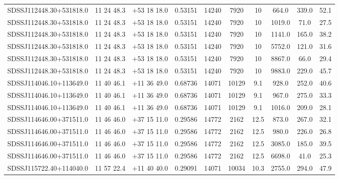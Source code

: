 \begin{landscape}
\begin{center}
\begin{longtable}{l c c c c c c c c c}
SDSSJ112448.30+531818.0  & 11 24 48.3  &         $+$53 18 18.0  &       0.53151  & 14240  &   7920  &       10  &        664.0  &   339.0  &  52.1  \\
SDSSJ112448.30+531818.0  & 11 24 48.3  &         $+$53 18 18.0  &       0.53151  & 14240  &   7920  &       10  &        1019.0  &  71.0  &   27.5  \\
SDSSJ112448.30+531818.0  & 11 24 48.3  &         $+$53 18 18.0  &       0.53151  & 14240  &   7920  &       10  &        1141.0  &  165.0  &  38.2  \\
SDSSJ112448.30+531818.0  & 11 24 48.3  &         $+$53 18 18.0  &       0.53151  & 14240  &   7920  &       10  &        5752.0  &  121.0  &  31.6  \\
SDSSJ112448.30+531818.0  & 11 24 48.3  &         $+$53 18 18.0  &       0.53151  & 14240  &   7920  &       10  &        8867.0  &  66.0  &   29.4  \\
SDSSJ112448.30+531818.0  & 11 24 48.3  &         $+$53 18 18.0  &       0.53151  & 14240  &   7920  &       10  &        9883.0  &  229.0  &  45.7  \\
SDSSJ114046.10+113649.0  & 11 40 46.1  &         $+$11 36 49.0  &       0.68736  & 14071  &   10129  &      9.1  &       928.0  &   252.0  &  40.6  \\
SDSSJ114046.10+113649.0  & 11 40 46.1  &         $+$11 36 49.0  &       0.68736  & 14071  &   10129  &      9.1  &       967.0  &   275.0  &  33.3  \\
SDSSJ114046.10+113649.0  & 11 40 46.1  &         $+$11 36 49.0  &       0.68736  & 14071  &   10129  &      9.1  &       1016.0  &  209.0  &  28.1  \\
SDSSJ114646.00+371511.0  & 11 46 46.0  &         $+$37 15 11.0  &       0.29586  & 14772  &   2162  &       12.5  &      873.0  &   267.0  &  32.1  \\
SDSSJ114646.00+371511.0  & 11 46 46.0  &         $+$37 15 11.0  &       0.29586  & 14772  &   2162  &       12.5  &      980.0  &   226.0  &  26.8  \\
SDSSJ114646.00+371511.0  & 11 46 46.0  &         $+$37 15 11.0  &       0.29586  & 14772  &   2162  &       12.5  &      3085.0  &  185.0  &  39.5  \\
SDSSJ114646.00+371511.0  & 11 46 46.0  &         $+$37 15 11.0  &       0.29586  & 14772  &   2162  &       12.5  &      6698.0  &  41.0  &   25.3  \\
SDSSJ115722.40+114040.0  & 11 57 22.4  &         $+$11 40 40.0  &       0.29091  & 14071  &   10034  &      10.3  &      2755.0  &  294.0  &  47.9  \\

\end{longtable}
\end{center}
\end{landscape}
